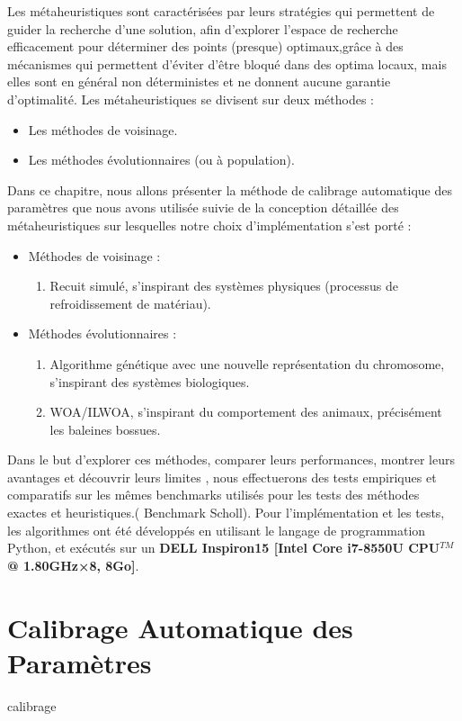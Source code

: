 \documentclass[12pt,a4paper, titlepage]{report}
\begin{document}
    Les métaheuristiques sont caractérisées par leurs stratégies qui permettent de guider la recherche d’une solution, afin d’explorer l’espace de recherche efficacement pour déterminer des points (presque) optimaux,grâce à des mécanismes qui permettent d’éviter d'être bloqué dans des optima locaux, mais elles sont en général non déterministes et ne donnent aucune garantie d’optimalité.
    Les métaheuristiques se divisent sur deux méthodes :
    \begin{itemize}
        \item Les méthodes de voisinage.
        \item Les méthodes évolutionnaires (ou à population).
    \end{itemize}
    Dans ce chapitre, nous allons présenter la méthode de calibrage automatique des paramètres que nous avons utilisée suivie de la conception détaillée des métaheuristiques sur lesquelles notre choix d’implémentation s’est porté :
    \begin{itemize}
        \item Méthodes de voisinage :
            \begin{enumerate}
                \item Recuit simulé, s’inspirant des systèmes physiques (processus de refroidissement de matériau).
            \end{enumerate}
        \item Méthodes évolutionnaires :
            \begin{enumerate}
                \item Algorithme génétique avec une nouvelle représentation du chromosome, s’inspirant des systèmes biologiques.
                \item WOA/ILWOA, s’inspirant du comportement des animaux, précisément les baleines bossues.
            \end{enumerate}
    \end{itemize}
    Dans le but d’explorer ces méthodes, comparer leurs performances, montrer leurs avantages et découvrir leurs limites , nous effectuerons des tests empiriques et comparatifs sur les mêmes  benchmarks utilisés pour les tests des méthodes exactes et heuristiques.( Benchmark Scholl).
    Pour l'implémentation et les tests, les algorithmes ont été développés en utilisant le langage de programmation Python, et exécutés sur un \textbf{DELL Inspiron15 [Intel Core i7-8550U CPU$^{TM}$ @ 1.80GHz×8, 8Go]}.
    \setcounter{section}{0}
    \section{Calibrage Automatique des Paramètres}
    {calibrage}
\end{document}
